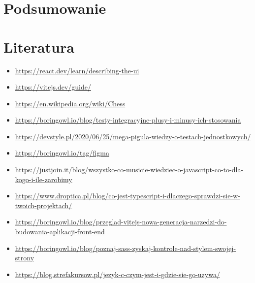 \documentclass[12pt,a4paper]{article}
\begin{document}
\section{Podsumowanie}

\newpage

\section{Literatura}

\begin{itemize}
    \item \href{https://react.dev/learn/describing-the-ui}{https://react.dev/learn/describing-the-ui}
    \item \href{https://vitejs.dev/guide/}{https://vitejs.dev/guide/}
    \item \href{https://en.wikipedia.org/wiki/Chess}{https://en.wikipedia.org/wiki/Chess}
    \item \href{https://boringowl.io/blog/testy-integracyjne-plusy-i-minusy-ich-stosowania}{https://boringowl.io/blog/testy-integracyjne-plusy-i-minusy-ich-stosowania}
    \item \href{https://devstyle.pl/2020/06/25/mega-pigula-wiedzy-o-testach-jednostkowych/}{https://devstyle.pl/2020/06/25/mega-pigula-wiedzy-o-testach-jednostkowych/}
    \item \href{https://boringowl.io/tag/figma}{https://boringowl.io/tag/figma}
    \item \href{https://justjoin.it/blog/wszystko-co-musicie-wiedziec-o-javascript-co-to-dla-kogo-i-ile-zarobimy}{https://justjoin.it/blog/wszystko-co-musicie-wiedziec-o-javascript-co-to-dla-kogo-i-ile-zarobimy}
    \item \href{https://www.droptica.pl/blog/co-jest-typescript-i-dlaczego-sprawdzi-sie-w-twoich-projektach/}{https://www.droptica.pl/blog/co-jest-typescript-i-dlaczego-sprawdzi-sie-w-twoich-projektach/}
    \item \href{https://boringowl.io/blog/przeglad-vitejs-nowa-generacja-narzedzi-do-budowania-aplikacji-front-end}{https://boringowl.io/blog/przeglad-vitejs-nowa-generacja-narzedzi-do-budowania-aplikacji-front-end}
    \item \href{https://boringowl.io/blog/poznaj-sass-zyskaj-kontrole-nad-stylem-swojej-strony}{https://boringowl.io/blog/poznaj-sass-zyskaj-kontrole-nad-stylem-swojej-strony}
    \item \href{https://blog.strefakursow.pl/jezyk-c-czym-jest-i-gdzie-sie-go-uzywa/}{https://blog.strefakursow.pl/jezyk-c-czym-jest-i-gdzie-sie-go-uzywa/}

\end{itemize}
\end{document}
